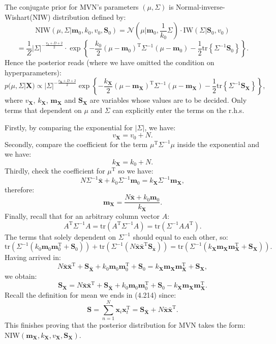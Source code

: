 \documentclass[UTF8]{ctexart}
\begin{document}
The conjugate prior for MVN's parameters $(\mu,\Sigma)$ is Normal-inverse-Wishart(NIW) distribution defined by:
$$\text{NIW}(\mu,\Sigma|\textbf{m}_{0},k_{0},v_{0},\textbf{S}_{0}) = \mathcal{N}(\mu|\textbf{m}_{0},\frac{1}{k_{0}}\Sigma)\cdot \text{IW}(\Sigma|\textbf{S}_{0},v_{0})$$
$$=\frac{1}{Z} |\Sigma|^{-\frac{v_{0} + D + 2}{2}}\cdot\exp\left\{ -\frac{k_{0}}{2}(\mu-\textbf{m}_{0})^{\text{T}}\Sigma^{-1}(\mu-\textbf{m}_{0})-\frac{1}{2}\text{tr}\left\{ \Sigma^{-1}\textbf{S}_{0} \right\} \right\}.$$
Hence the posterior reads (where we have omitted the condition on hyperparameters):
$$p(\mu,\Sigma|\textbf{X}) \propto |\Sigma|^{-\frac{v_{\textbf{X}}+D+2}{2}}\exp\left\{ -\frac{k_{\textbf{X}}}{2}(\mu-\textbf{m}_{\textbf{X}})^{\text{T}}\Sigma^{-1}(\mu-\textbf{m}_{\textbf{X}}) - \frac{1}{2}\text{tr}\left\{  \Sigma^{-1} \textbf{S}_{\textbf{X}}\right\} \right\},$$
where $v_{\textbf{X}}$, $k_{\textbf{X}}$, $\textbf{m}_{\textbf{X}}$ and $\textbf{S}_{\textbf{X}}$ are variables whose values are to be decided.
Only terms that dependent on $\mu$ and $\Sigma$ can explicitly enter the terms on the r.h.s.

Firstly, by comparing the exponential for $|\Sigma|$, we have:
$$v_{\textbf{X}} = v_{0} + N.$$
Secondly, compare the coefficient for the term $\mu^{\text{T}}\Sigma^{-1}\mu$ inside the exponential and we have:
$$k_{\textbf{X}} = k_{0} + N.$$
Thirdly, check the coefficient for $\mu^{\text{T}}$ so we have:
$$N\Sigma^{-1}\bar{\textbf{x}}+k_{0}\Sigma^{-1}\textbf{m}_{0}=k_{\textbf{X}}\Sigma^{-1}\textbf{m}_{\textbf{X}},$$
therefore:
$$\textbf{m}_{\textbf{X}} = \frac{N\bar{\textbf{x}}+k_{0}\textbf{m}_{0}}{k_{\textbf{X}}}.$$
Finally, recall that for an arbitrary column vector $A$:
$$A^{\text{T}}\Sigma^{-1}A=\text{tr}(A^{\text{T}}\Sigma^{-1}A)=\text{tr}(\Sigma^{-1}AA^{\text{T}}).$$
The terms that solely dependent on $\Sigma^{-1}$ should equal to each other, so:
$$\text{tr}(\Sigma^{-1}(k_{0}\textbf{m}_{0}\textbf{m}_{0}^{\text{T}}+\textbf{S}_{0}))+\text{tr}(\Sigma^{-1}(N\bar{\textbf{x}}\bar{\textbf{x}}^{\text{T}}\textbf{S}_{\bar{\textbf{x}}}))=\text{tr}(\Sigma^{-1}(k_{\textbf{X}}\textbf{m}_{\textbf{X}}\textbf{m}_{\textbf{X}}^{\text{T}}+\textbf{S}_{\textbf{X}})).$$
Having arrived in:
$$N \bar{\textbf{x}} \bar{\textbf{x}}^{\text{T}} + \textbf{S}_{\bar{\textbf{X}}} + k_{0}\textbf{m}_{0}\textbf{m}_{0}^{\text{T}} + \textbf{S}_{0} = k_{\textbf{X}}\textbf{m}_{\textbf{X}}\textbf{m}_{\textbf{X}}^{\text{T}} + \textbf{S}_{\textbf{X}},$$
we obtain:
$$\textbf{S}_{\textbf{X}} = N \bar{\textbf{x}} \bar{\textbf{x}}^{\text{T}} + \textbf{S}_{\bar{\textbf{X}}} + k_{0}\textbf{m}_{0}\textbf{m}_{0}^{\text{T}} + \textbf{S}_{0} - k_{\textbf{X}}\textbf{m}_{\textbf{X}}\textbf{m}_{\textbf{X}}^{\text{T}}.$$
Recall the definition for mean we ends in (4.214) since:
$$\textbf{S}=\sum_{n=1}^{N}\textbf{x}_{i}\textbf{x}_{t}^{\text{T}} = \textbf{S}_{\bar{\textbf{X}}} + N \bar{\textbf{x}}\bar{\textbf{x}}^{\text{T}}.$$
This finishes proving that the posterior distribution for MVN takes the form: $\text{NIW}(\textbf{m}_{\textbf{X}},k_{\textbf{X}},v_{\textbf{X}},\textbf{S}_{\textbf{X}}).$
\end{document}
